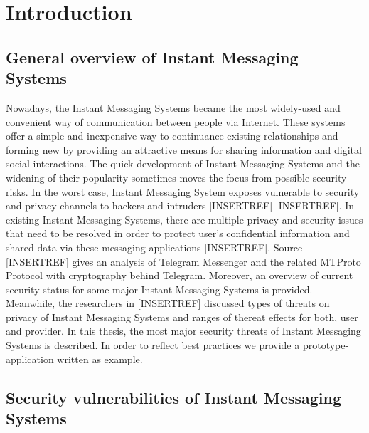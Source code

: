 \chapter{Introduction}\label{ch:introduction}


\newcommand{\keyword}[1]{\textbf{#1}}
\newcommand{\tabhead}[1]{\textbf{#1}}
\newcommand{\code}[1]{\texttt{#1}}
\newcommand{\file}[1]{\texttt{\bfseries#1}}
\newcommand{\option}[1]{\texttt{\itshape#1}}



\section{General overview of Instant Messaging Systems}\label{sec:general-overview-of-im-system}
Nowadays, the Instant Messaging Systems became the most widely-used and convenient way of communication between
people via Internet.
These systems offer a simple and inexpensive way to continuance existing relationships and forming new by providing an
attractive means for sharing information and digital social interactions.
The quick development of Instant Messaging Systems and the widening of their popularity sometimes moves the focus from possible security risks.
In the worst case, Instant Messaging System exposes vulnerable to security and privacy channels to hackers and intruders [INSERTREF] [INSERTREF].
In existing Instant Messaging Systems, there are multiple privacy and security issues that need to be resolved in order to protect user's confidential
information and shared data via these messaging applications [INSERTREF].
Source [INSERTREF] gives an analysis of Telegram Messenger and the related MTProto Protocol with cryptography
behind Telegram.
Moreover, an overview of current security status for some major Instant Messaging Systems is provided.
Meanwhile, the researchers in [INSERTREF] discussed types of threats on privacy of Instant Messaging Systems
and ranges of thereat effects for both, user and provider.
In this thesis, the most major security threats of Instant Messaging Systems is described.
In order to reflect best practices we provide a prototype-application written as example.


\section{Security vulnerabilities of Instant Messaging Systems}\label{sec:security-vulnerabilities-of-instant-messaging-systems}


